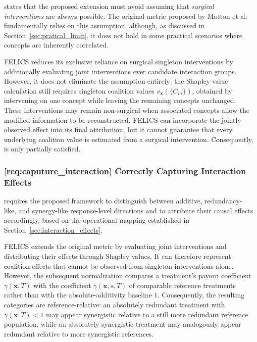  states that the proposed extension must avoid assuming that \emph{surgical interventions} are always possible. The original metric proposed by Matton et al.~\cite{mattonWalkTalkMeasuring2024} fundamentally relies on this assumption, although, as discussed in Section~\ref{sec:pratical_limit}, it does not hold in some practical scenarios where concepts are inherently correlated.

FELICS reduces its exclusive reliance on surgical singleton interventions by additionally evaluating joint interventions over candidate interaction groups. However, it does not eliminate the assumption entirely: the Shapley-value calculation still requires singleton coalition values $v_{\mathbf{x}}(\{C_m\})$, obtained by intervening on one concept while leaving the remaining concepts unchanged. These interventions may remain non-surgical when associated concepts allow the modified information to be reconstructed. FELICS can incorporate the jointly observed effect into its final attribution, but it cannot guarantee that every underlying coalition value is estimated from a surgical intervention. Consequently,  is only partially satisfied.

\subsubsection{\ref{req:caputure_interaction} Correctly Capturing Interaction Effects}

 requires the proposed framework to distinguish between additive, redundancy-like, and synergy-like response-level directions and to attribute their causal effects accordingly, based on the operational mapping established in Section~\ref{sec:interaction_effects}.

FELICS extends the original metric by evaluating joint interventions and distributing their effects through Shapley values. It can therefore represent coalition effects that cannot be observed from singleton interventions alone. However, the subsequent normalization compares a treatment's payout coefficient $\gamma(\mathbf{x},T)$ with the coefficient $\bar\gamma(\mathbf{x},s,T)$ of comparable reference treatments rather than with the absolute-additivity baseline $1$. Consequently, the resulting categories are reference-relative: an absolutely redundant treatment with $\gamma(\mathbf{x},T)<1$ may appear synergistic relative to a still more redundant reference population, while an absolutely synergistic treatment may analogously appear redundant relative to more synergistic references.

